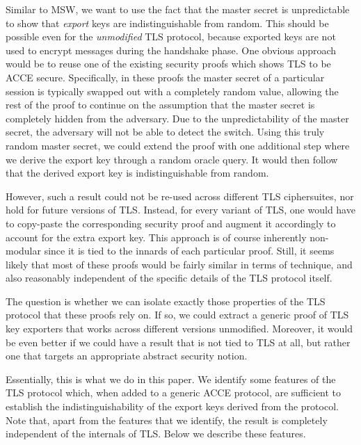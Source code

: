 Similar to MSW, we want to use the fact that the master secret is unpredictable to show that \emph{export} keys are indistinguishable
from random. 
This should be possible even for the \emph{unmodified} TLS protocol, 
because exported keys are not used to encrypt messages during the handshake phase.
One obvious approach would be to reuse one of the existing security proofs which shows TLS to be ACCE secure.
Specifically, in these proofs the master secret of a particular session is typically swapped out with a completely random value,
allowing the rest of the proof to continue on the assumption that the master secret is completely hidden from the adversary.
Due to the unpredictability of the master secret,
the adversary will not be able to detect the switch.
Using this truly random master secret,
we could extend the proof with one additional step where we derive the export key through a random oracle query.
It would then follow that the derived export key is indistinguishable from random. 

However,
such a result could not be re-used across different TLS ciphersuites,
nor hold for future versions of TLS. 
Instead, for every variant of TLS,
one would have to copy-paste the corresponding security proof and augment it accordingly to account for the extra export key.
This approach is of course inherently non-modular since it is tied to the innards of each particular proof.
Still,
it seems likely that most of these proofs would be fairly similar in terms of technique,
and also reasonably independent of the specific details of the TLS protocol itself.  

The question is whether we can isolate exactly those properties of the TLS protocol that these proofs rely on.
If so, we could extract a generic proof of TLS key exporters that works across different versions unmodified.
Moreover,
it would be even better if we could have a result that is not tied to TLS at all,
but rather one that targets an appropriate abstract security notion.

Essentially,
this is what we do in this paper.
We identify some features of the TLS protocol which,
when added to a generic ACCE protocol,
are sufficient to establish the indistinguishability of the export keys derived from the protocol.
Note that,
apart from the features that we identify,
the result is completely independent of the internals of TLS. 
Below we describe these features.
%

